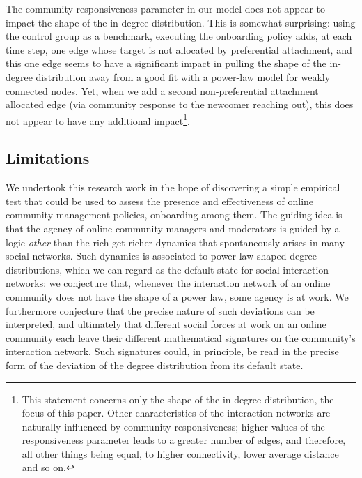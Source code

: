 \documentclass{article}
\begin{document}
The community responsiveness parameter in our model does not appear to impact the shape of the in-degree distribution. This is somewhat surprising: using the control group as a benchmark, executing the onboarding policy adds, at each time step, one edge whose target is not allocated by preferential attachment, and this one edge seems to have a significant impact in pulling the shape of the in-degree distribution away from a good fit with a power-law model for weakly connected nodes. Yet, when we add a second non-preferential attachment allocated edge (via community response to the newcomer reaching out), this does not appear to have any additional impact\footnote{This statement concerns only the shape of the in-degree distribution, the focus of this paper. Other characteristics of the interaction networks are naturally influenced by community responsiveness; higher values of the responsiveness parameter leads to a greater number of edges, and therefore, all other things being equal, to higher connectivity, lower average distance and so on. }.

\subsection{Limitations}

We undertook this research work in the hope of discovering a simple empirical test that could be used to assess the presence and effectiveness of online community management policies, onboarding among them. The guiding idea is that the agency of online community managers and moderators is guided by a logic \textit{other} than the rich-get-richer dynamics that spontaneously arises in many social networks. Such dynamics is associated to power-law shaped degree distributions, which we can regard as the default state for social interaction networks: we conjecture that, whenever the interaction network of an online community does not have the shape of a power law, some agency is at work. We furthermore conjecture that the precise nature of such deviations can be interpreted, and ultimately that different social forces at work on an online community each leave their different mathematical signatures on the community's interaction network. Such signatures could, in principle, be read in the precise form of the deviation of the degree distribution from its default state. 
\end{document}
